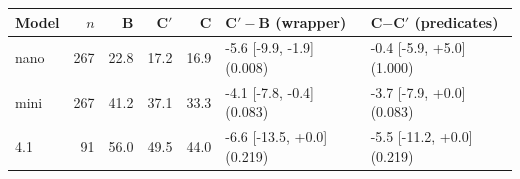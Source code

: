 \begin{tabular}{lrrrrll}
\toprule
Model & $n$ & B & C$'$ & C & C$'-$B (wrapper) & C$-$C$'$ (predicates) \\
\midrule
nano & 267 & 22.8 & 17.2 & 16.9 & -5.6 [-9.9, -1.9] (0.008) & -0.4 [-5.9, +5.0] (1.000) \\
mini & 267 & 41.2 & 37.1 & 33.3 & -4.1 [-7.8, -0.4] (0.083) & -3.7 [-7.9, +0.0] (0.083) \\
4.1 & 91 & 56.0 & 49.5 & 44.0 & -6.6 [-13.5, +0.0] (0.219) & -5.5 [-11.2, +0.0] (0.219) \\
\bottomrule
\end{tabular}